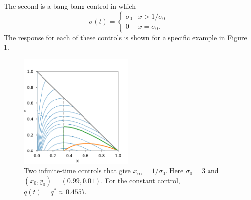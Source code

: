 \documentclass[english,12pt,letter]{article}
\newcommand{\Rnot}{\sigma_0}
\newcommand{\Sinf}{x_\infty}
\begin{document}
The second is a bang-bang control in which
$$
    \sigma(t) = \begin{cases} \Rnot & x>1/\Rnot \\ 0 & x=\Rnot. \end{cases}
$$
The response for each of these controls is shown for a specific example in
Figure \ref{fig:two-controls}.
\begin{figure}
    \centering
    \includegraphics[width=0.5\textwidth]{figures/twocontrols.pdf}
    \caption{Two infinite-time controls that give $\Sinf=1/\Rnot$.  Here $\Rnot=3$ and
        $(x_0,y_0)=(0.99,0.01)$.  For the constant control, $q(t)=q^*\approx0.4557$.\label{fig:two-controls}}
\end{figure}
\end{document}
